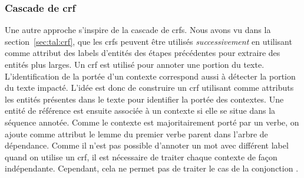 \subsubsection{Cascade de \gls*{crf}}
\label{sec:tal:ctx:crf}

Une autre approche s'inspire de la cascade de \glspl{crf}.
Nous avons vu dans la section~\ref{sec:tal:crf}, que les \glspl{crf} peuvent être utilisés \emph{successivement} en utilisant comme attribut des labels d'entités des étapes précédentes pour extraire des entités plus larges.
Un \gls{crf} est utilisé pour annoter une portion du texte.
L'identification de la portée d'un contexte correspond aussi à détecter la portion du texte impacté.
L'idée est donc de construire un \gls{crf} utilisant comme attributs les entités présentes dans le texte pour identifier la portée des contextes.
Une entité de référence est ensuite associée à un contexte si elle se situe dans la séquence annotée.
Comme le contexte est majoritairement porté par un verbe, on ajoute comme attribut le lemme du premier verbe parent dans l'arbre de dépendance.
Comme il n'est pas possible d'annoter un mot avec différent label quand on utilise un \gls{crf}, il est nécessaire de traiter chaque contexte de façon indépendante.
Cependant, cela ne permet pas de traiter le cas de la conjonction .
